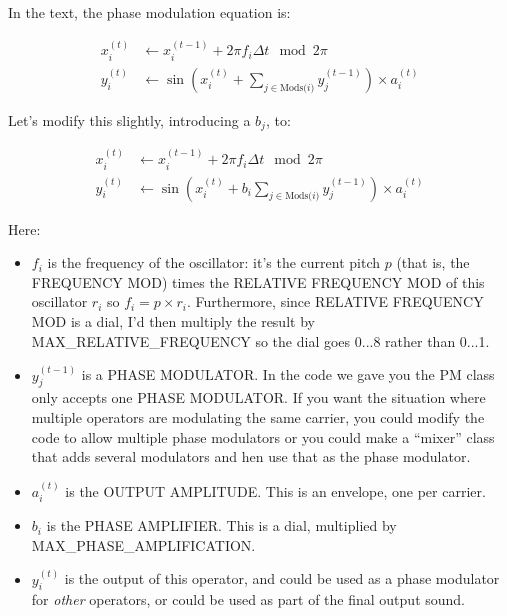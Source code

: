 \documentclass{article}
\begin{document}
In the text, the phase modulation equation is:

\[
\begin{split}
x_i^{(t)} &\leftarrow x_i^{(t-1)} + 2 \pi f_i \Delta t \mod 2 \pi\\
y_i^{(t)} &\leftarrow \sin\left(x_i^{(t)} + \sum_{j \in \text{Mods(\(i\))}} y_j^{(t-1)}\right) \times a_i^{(t)}
\end{split}
\]

Let's modify this slightly, introducing a \(b_j\), to:

\[
\begin{split}
x_i^{(t)} &\leftarrow x_i^{(t-1)} + 2 \pi f_i \Delta t \mod 2 \pi\\
y_i^{(t)} &\leftarrow \sin\left(x_i^{(t)} + b_i \sum_{j \in \text{Mods(\(i\))}} y_j^{(t-1)}\right) \times a_i^{(t)}
\end{split}
\]

Here:

\begin{itemize}
\item \(f_i\) is the frequency of the oscillator: it's the current pitch \(p\) (that is, the FREQUENCY MOD) times the RELATIVE FREQUENCY MOD of this oscillator \(r_i\) so \(f_i = p \times r_i\).  Furthermore, since RELATIVE FREQUENCY MOD is a dial, I'd then multiply the result by MAX\_RELATIVE\_FREQUENCY so the dial goes 0...8 rather than 0...1.
\item \(y_j^{(t-1)}\) is a PHASE MODULATOR.  In the code we gave you the PM class only accepts one PHASE MODULATOR.  If you want the situation where multiple operators are modulating the same carrier, you could modify the code to allow multiple phase modulators or you could make a ``mixer'' class that adds several modulators and hen use that as the phase modulator.
\item \(a_i^{(t)}\) is the OUTPUT AMPLITUDE.  This is an envelope, one per carrier.
\item \(b_i\) is the PHASE AMPLIFIER.   This is a dial, multiplied by MAX\_PHASE\_AMPLIFICATION.
\item \(y_i^{(t)}\) is the output of this operator, and could be used as a phase modulator for {\it other} operators, or could be used as part of the final output sound.
\end{itemize}
\end{document}
